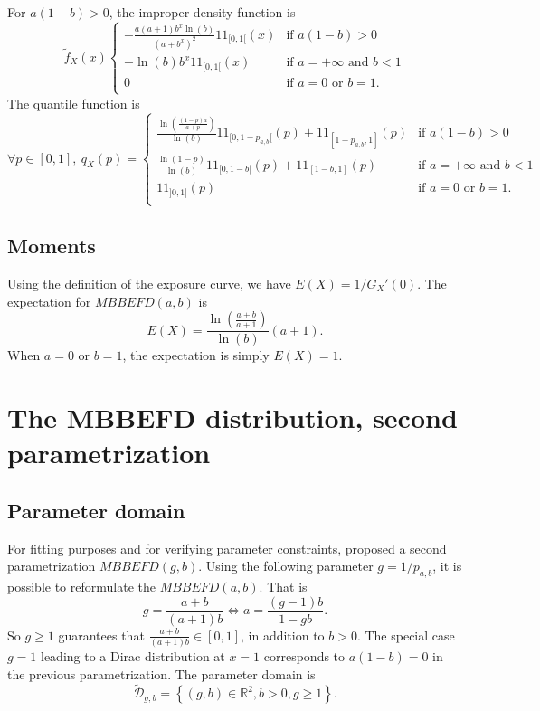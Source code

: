 \documentclass[article, nojss]{jss}
\newcommand{\ind}{1\!\!1}
\newcommand{\R}{\mathbb R}
\newcommand{\calD}{\mathcal D}
\newcommand{\systL}{\left\{\begin{array}{ll}}
\newcommand{\systR}{\end{array}\right.}
\begin{document}
For $a(1-b)>0$, the improper density function is 
\begin{equation}
\tilde f_X(x) 
\systL
-\frac{a(a+1)b^x\ln(b)}{(a+b^x)^2}\ind_{[0,1[}(x) & \text{if } a(1-b) >0 \\
-\ln(b)b^x\ind_{[0,1[}(x)  & \text{if } a=+\infty \text{ and } b<1 \\
0 & \text{if } a=0 \text{ or } b=1. \\
\systR
\label{impd:mbbefd:ab}
\end{equation}
The quantile function is 
\begin{equation}
\forall p\in [0,1],~
q_X(p) = 
\systL
\frac{\ln\left(\frac{(1-p)a}{a+p}\right)}{\ln(b)} \ind_{[0,1-p_{a,b}[}(p) + \ind_{[1-p_{a,b},1]}(p)  & \text{if } a(1-b) >0 \\
\frac{\ln(1-p)}{\ln(b)}\ind_{[0,1-b[}(p) + \ind_{[1-b,1]}(p)   & \text{if } a=+\infty \text{ and } b<1 \\
\ind_{]0,1]}(p) & \text{if } a=0 \text{ or } b=1. \\
\systR
\label{q:mbbefd:ab}
\end{equation}


\subsection{Moments}
Using the definition of the exposure curve, we have
$E(X) = 1/G_X'(0).$
The expectation for $MBBEFD(a,b)$ is
$$
E(X)=\frac{\ln(\frac{a+b}{a+1})}{\ln(b)} (a+1).
$$
When $a=0$ or $b=1$, the expectation is simply $E(X)=1$.



\section{The MBBEFD distribution, second parametrization}

\subsection{Parameter domain}

For fitting purposes and for verifying parameter constraints, 
\cite{bernegger97} proposed a second parametrization $MBBEFD(g,b)$.
Using the following parameter $g=1/p_{a,b}$, it is possible to reformulate the $MBBEFD(a,b)$.
That is
$$
g= \frac{a+b}{(a+1)b}
\Leftrightarrow
a=\frac{(g-1)b}{1-gb}.
$$
So $g\geq 1$ guarantees that $\frac{a+b}{(a+1)b}\in [0,1]$, in addition to $b>0$.
The special case $g=1$ leading to a Dirac distribution at $x=1$ corresponds to $a(1-b)=0$ in the previous parametrization.
The parameter domain is
$$
\widetilde{\calD}_{g,b}= \left\{
(g,b)\in\R^2, b>0, g\geq 1
\right\}.
$$
\end{document}
